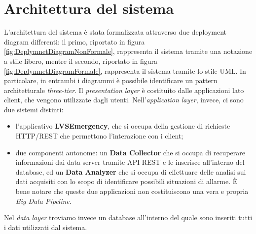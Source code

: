 \clearpage
\section{Architettura del sistema}
L'architettura del sistema è stata formalizzata attraverso due deployment diagram differenti: il primo, riportato in figura \ref{fig:DeplymnetDiagramNonFormale}, rappresenta il sistema tramite una notazione a stile libero, mentre il secondo, riportato in figura \ref{fig:DeplymnetDiagramFormale}, rappresenta il sistema tramite lo stile UML. In particolare, in entrambi i diagrammi è possibile identificare un pattern architetturale \textit{three-tier}. Il \textit{presentation layer} è costituito dalle applicazioni lato client, che vengono utilizzate dagli utenti. Nell'\textit{application layer}, invece, ci sono due sistemi distinti:

\begin{itemize}
	\item l'applicativo \textbf{LVSEmergency}, che si occupa della gestione di richieste HTTP/REST che permettono l'interazione con i client;
	\item due componenti autonome: un \textbf{Data Collector} che si occupa di recuperare informazioni dai data server tramite API REST e le inserisce all'interno del database, ed un \textbf{Data Analyzer} che si occupa di effettuare delle analisi sui dati acquisiti con lo scopo di identificare possibili situazioni di allarme. È bene notare che queste due applicazioni non costituiscono una vera e propria \textit{Big Data Pipeline}.
\end{itemize}

Nel \textit{data layer} troviamo invece un database all'interno del quale sono inseriti tutti i dati utilizzati dal sistema.

